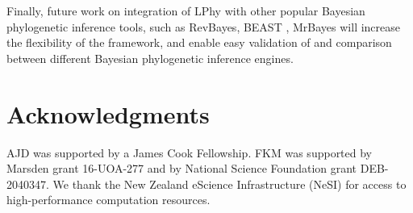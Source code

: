 \documentclass[10pt,letterpaper,table]{article}
\theoremstyle{definition}
\begin{document}
Finally, future work on integration of LPhy with other popular Bayesian phylogenetic inference tools, such as RevBayes\cite{hohna2016revbayes}, BEAST \cite{suchard2018bayesian}, MrBayes\cite{ronquist2012mrbayes} will increase the flexibility of the framework, and enable easy validation of and comparison between different Bayesian phylogenetic inference engines.

\section*{Acknowledgments}
AJD was supported by a James Cook Fellowship. FKM was supported by Marsden grant 16-UOA-277 and by National Science Foundation grant DEB-2040347. We thank the New Zealand eScience Infrastructure (NeSI) for access to high-performance computation resources.

\nolinenumbers

%
%
% 

\end{document}

